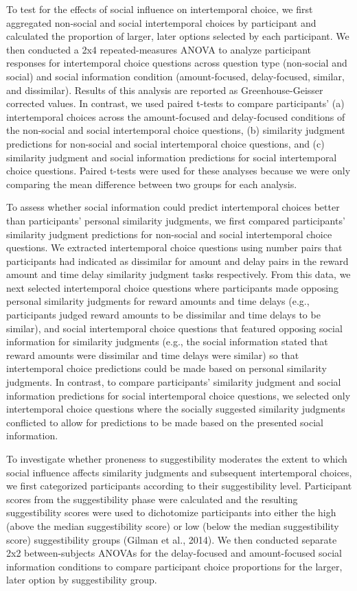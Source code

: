 \documentclass[
  pub,floatsintext]{apa6}
\begin{document}
To test for the effects of social influence on intertemporal choice, we first aggregated non-social and social intertemporal choices by participant and calculated the proportion of larger, later options selected by each participant. We then conducted a 2x4 repeated-measures ANOVA to analyze participant responses for intertemporal choice questions across question type (non-social and social) and social information condition (amount-focused, delay-focused, similar, and dissimilar). Results of this analysis are reported as Greenhouse-Geisser corrected values. In contrast, we used paired t-tests to compare participants' (a) intertemporal choices across the amount-focused and delay-focused conditions of the non-social and social intertemporal choice questions, (b) similarity judgment predictions for non-social and social intertemporal choice questions, and (c) similarity judgment and social information predictions for social intertemporal choice questions. Paired t-tests were used for these analyses because we were only comparing the mean difference between two groups for each analysis.

To assess whether social information could predict intertemporal choices better than participants' personal similarity judgments, we first compared participants' similarity judgment predictions for non-social and social intertemporal choice questions. We extracted intertemporal choice questions using number pairs that participants had indicated as dissimilar for amount and delay pairs in the reward amount and time delay similarity judgment tasks respectively. From this data, we next selected intertemporal choice questions where participants made opposing personal similarity judgments for reward amounts and time delays (e.g., participants judged reward amounts to be dissimilar and time delays to be similar), and social intertemporal choice questions that featured opposing social information for similarity judgments (e.g., the social information stated that reward amounts were dissimilar and time delays were similar) so that intertemporal choice predictions could be made based on personal similarity judgments. In contrast, to compare participants' similarity judgment and social information predictions for social intertemporal choice questions, we selected only intertemporal choice questions where the socially suggested similarity judgments conflicted to allow for predictions to be made based on the presented social information.

To investigate whether proneness to suggestibility moderates the extent to which social influence affects similarity judgments and subsequent intertemporal choices, we first categorized participants according to their suggestibility level. Participant scores from the suggestibility phase were calculated and the resulting suggestibility scores were used to dichotomize participants into either the high (above the median suggestibility score) or low (below the median suggestibility score) suggestibility groups (Gilman et al., 2014). We then conducted separate 2x2 between-subjects ANOVAs for the delay-focused and amount-focused social information conditions to compare participant choice proportions for the larger, later option by suggestibility group.
\end{document}

